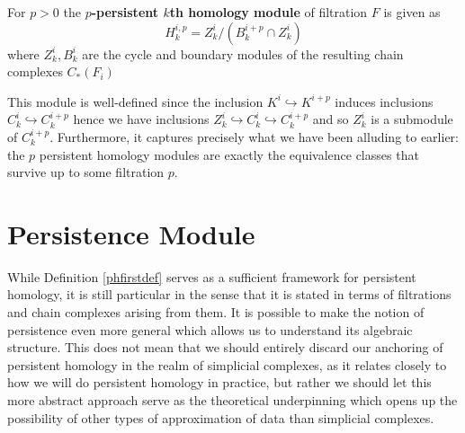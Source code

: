 \begin{definition}\label{phfirstdef}
  For $p > 0$ the \textbf{$p$-persistent $k$th homology module} of filtration $F$ is given as
  \[H^{i,p}_{k} = Z^{i}_{k}/(B^{{i+p}}_{k} \cap Z^{i}_{k})\]
  where $Z^{i}_{k},B^{i}_{k}$ are the cycle and boundary modules of the resulting chain complexes $C_*(F_{i})$
\end{definition}
This module is well-defined since the inclusion $K^{i} \hookrightarrow K^{i+p}$ induces inclusions $C^{i}_{k} \hookrightarrow C_{k}^{i+p}$ hence we have inclusions $Z^{i}_{k} \hookrightarrow C^{i}_{k} \hookrightarrow C_{k}^{i+p}$ and so $Z^{i}_{k}$ is a submodule of $C^{i+p}_{k}$. Furthermore, it captures precisely what we have been alluding to earlier: the $p$ persistent homology modules are exactly the equivalence classes that survive up to some filtration $p$.


\section{Persistence Module}
While Definition \ref{phfirstdef} serves as a sufficient framework for persistent homology, it is still particular in the sense that it is stated in terms of filtrations and chain complexes arising from them. It is possible to make the notion of persistence even more general which allows us to understand its algebraic structure. This does not mean that we should entirely discard our anchoring of persistent homology in the realm of simplicial complexes, as it relates closely to how we will do persistent homology in practice, but rather we should let this more abstract approach serve as the theoretical underpinning which opens up the possibility of other types of approximation of data than simplicial complexes.

